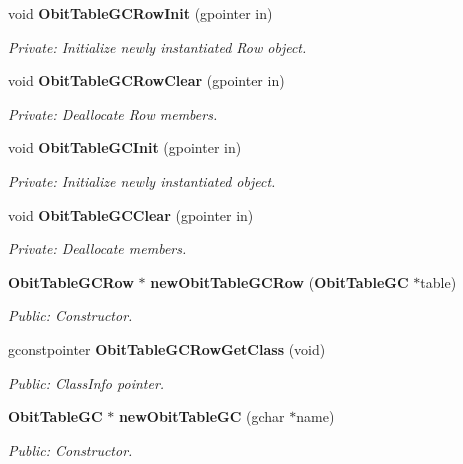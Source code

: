 \begin{CompactItemize}
\item 
void {\bf Obit\-Table\-GCRow\-Init} (gpointer in)
\begin{CompactList}\small\item\em Private: Initialize newly instantiated Row object. \item\end{CompactList}\item 
void {\bf Obit\-Table\-GCRow\-Clear} (gpointer in)
\begin{CompactList}\small\item\em Private: Deallocate Row members. \item\end{CompactList}\item 
void {\bf Obit\-Table\-GCInit} (gpointer in)
\begin{CompactList}\small\item\em Private: Initialize newly instantiated object. \item\end{CompactList}\item 
void {\bf Obit\-Table\-GCClear} (gpointer in)
\begin{CompactList}\small\item\em Private: Deallocate members. \item\end{CompactList}\item 
{\bf Obit\-Table\-GCRow} $\ast$ {\bf new\-Obit\-Table\-GCRow} ({\bf Obit\-Table\-GC} $\ast$table)
\begin{CompactList}\small\item\em Public: Constructor. \item\end{CompactList}\item 
gconstpointer {\bf Obit\-Table\-GCRow\-Get\-Class} (void)
\begin{CompactList}\small\item\em Public: Class\-Info pointer. \item\end{CompactList}\item 
{\bf Obit\-Table\-GC} $\ast$ {\bf new\-Obit\-Table\-GC} (gchar $\ast$name)
\begin{CompactList}\small\item\em Public: Constructor. \item\end{CompactList}\item 

\end{CompactItemize}
